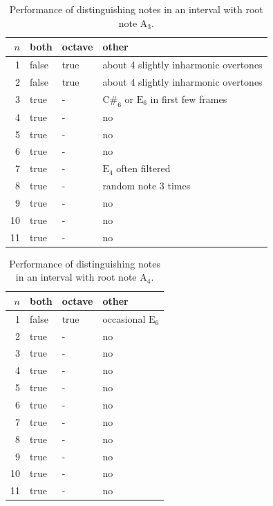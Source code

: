\documentclass[10pt,twocolumn]{article}
\begin{document}
\vspace{-3mm}
\begin{table}[H]
    \centering
    \begin{tabular}{r|lll}
        $n$ & both & octave & other \\
        \hline
        1  & false & true & about 4 slightly inharmonic overtones \\
        2  & false & true & about 4 slightly inharmonic overtones \\
        3  & true & - & $\text{C\#}_6$ or $\text{E}_6$ in first few frames \\
        4  & true & - & no \\
        5  & true & - & no \\
        6  & true & - & no \\
        7  & true & - & $\text{E}_4$ often filtered \\
        8  & true & - & random note 3 times \\
        9  & true & - & no \\
        10 & true & - & no \\
        11 & true & - & no
    \end{tabular}
    \caption{Performance of distinguishing notes in an interval with root note $\text{A}_3$.}
    \label{tab:polperf2}
\end{table}
\vspace{-3mm}
\begin{table}[H]
    \centering
    \begin{tabular}{r|lll}
        $n$ & both & octave & other \\
        \hline
        1  & false & true & occasional $\text{E}_6$ \\
        2  & true & - & no \\
        3  & true & - & no \\
        4  & true & - & no \\
        5  & true & - & no \\
        6  & true & - & no \\
        7  & true & - & no \\
        8  & true & - & no \\
        9  & true & - & no \\
        10 & true & - & no \\
        11 & true & - & no
    \end{tabular}
    \caption{Performance of distinguishing notes in an interval with root note $\text{A}_4$.}
    \label{tab:polperf3}
\end{table}%
\end{document}
